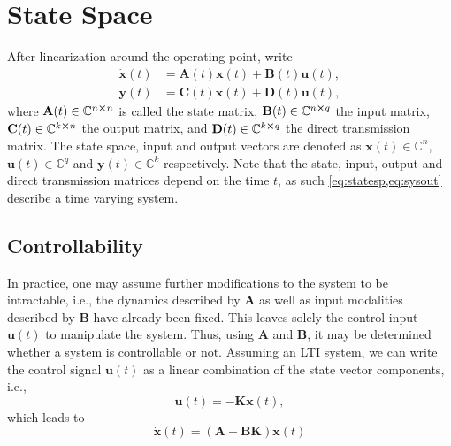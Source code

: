 \documentclass[]{report}
\newcommand{\CC}[0]{\mathbb{C}}
\begin{document}
\section{State Space}
After linearization around the operating point, write
\begin{align}
	\mathbf{\dot{x}}(t) &= \mathbf{A}(t)\mathbf{x}(t) + \mathbf{B}(t)\mathbf{u}(t),\label{eq:statesp}\\
	\mathbf{y}(t) &= \mathbf{C}(t)\mathbf{x}(t) + \mathbf{D}(t)\mathbf{u}(t),\label{eq:sysout}
\end{align}
where $\mathbf{A}(t)\in\CC^{n\cross n}$ is called the state matrix, $\mathbf{B}(t)\in\CC^{n\cross q}$ the input matrix, $\mathbf{C}(t)\in\CC^{k\cross n}$ the output matrix, and $\mathbf{D}(t)\in\CC^{k\cross q}$ the direct transmission matrix.
The state space, input and output vectors are denoted as $\mathbf{x}(t)\in\CC^{n}$, $\mathbf{u}(t)\in\CC^{q}$ and $\mathbf{y}(t)\in\CC^{k}$ respectively.
Note that the state, input, output and direct transmission matrices depend on the time $t$, as such \cref{eq:statesp,eq:sysout} describe a time varying system. 
\subsection{Controllability}
In practice, one may assume further modifications to the system to be intractable, i.e., the dynamics described by $\mathbf{A}$ as well as input modalities described by $\mathbf{B}$ have already been fixed.
This leaves solely the control input $\mathbf{u}(t)$ to manipulate the system.
Thus, using $\mathbf{A}$ and $\mathbf{B}$, it may be determined whether a system is controllable or not. 
Assuming an LTI system, we can write the control signal $\mathbf{u}(t)$ as a linear combination of the state vector components, i.e., 
\begin{equation}
	\mathbf{u}(t) = -\mathbf{K}\mathbf{x}(t),
\end{equation} 
which leads to 
\begin{equation}
	\mathbf{\dot{x}}(t) = (\mathbf{A} - \mathbf{BK})\mathbf{x}(t)
\end{equation}
\end{document}
